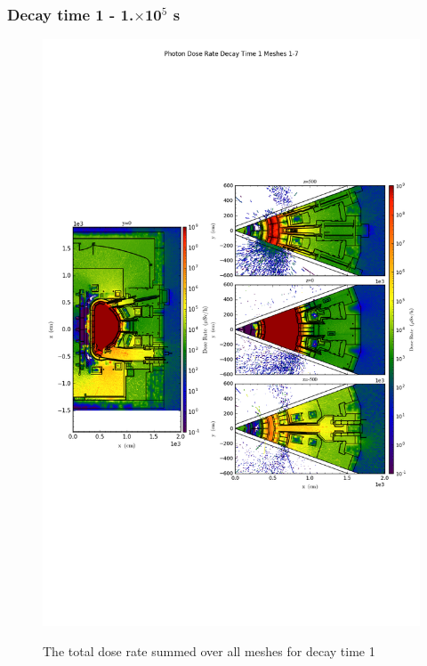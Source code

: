\documentclass[12pt]{article}
\begin{document}
\subsubsection{Decay time 1 - 1.$\times$10$^5$ s}
\begin{figure}[ht!]
\centering
\includegraphics[trim={0cm 9cm 0cm 10cm},clip,scale=0.75]{../plots/final_model_nob4c/Photon_Dose_Rate_Decay_Time_1_Meshes_1-7.png}
\label{fig:photons_dc1_no4bc_total}
\caption{The total dose rate summed over all meshes for decay time 1}
\end{figure}
\end{document}

